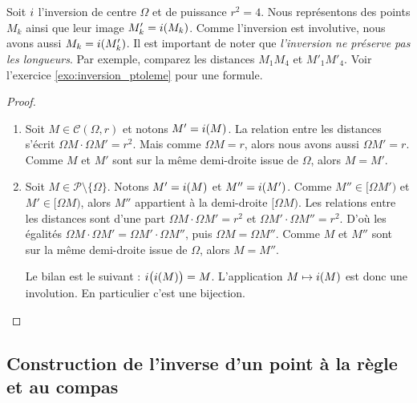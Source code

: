 \documentclass[11pt,class=report,crop=false]{standalone}
\begin{document}
\begin{exemple}
Soit $i$ l'inversion de centre $\Omega$ et de puissance $r^2=4$. 
Nous représentons des points $M_k$ ainsi que leur image $M'_k=i(M_k)$.
Comme l'inversion est involutive, nous avons aussi $M_k=i(M'_k)$.
Il est important de noter que \emph{l'inversion ne préserve pas les longueurs}.
Par exemple, comparez les distances $M_1M_4$ et $M'_1 M'_4$.
Voir l'exercice \ref{exo:inversion_ptoleme} pour une formule.
\end{exemple}

\begin{proof}~
\begin{enumerate}
  \item Soit $M \in \mathcal{C}(\Omega,r)$ et notons $M' = i(M)$.
  La relation entre les distances s'écrit $\Omega M \cdot \Omega M' = r^2$.
  Mais comme $\Omega M=r$, alors nous avons aussi $\Omega M' = r$. Comme $M$ et $M'$
  sont sur la même demi-droite issue de $\Omega$, alors $M=M'$.
  
  \item Soit $M \in \mathcal{P} \setminus \{\Omega\}$. Notons $M' = i(M)$ et $M'' = i(M')$.
  Comme $M'' \in [\Omega M')$ et $M' \in [\Omega M)$, alors $M''$ appartient à la demi-droite $[\Omega M)$.
  Les relations entre les distances sont d'une part $\Omega M \cdot \Omega M' = r^2$
  et $\Omega M' \cdot \Omega M'' = r^2$. D'où les égalités $\Omega M \cdot \Omega M' = \Omega M' \cdot \Omega M''$,
  puis $\Omega M=\Omega M''$. Comme $M$ et $M''$ sont sur la même demi-droite issue de $\Omega$, alors $M=M''$.
  
  Le bilan est le suivant : $i\big(i(M)\big) = M$. L'application $M \mapsto i(M)$ est donc une involution.
  En particulier c'est une bijection.
\end{enumerate}
\end{proof}


\subsection{Construction de l'inverse d'un point à la règle et au compas}
\end{document}

